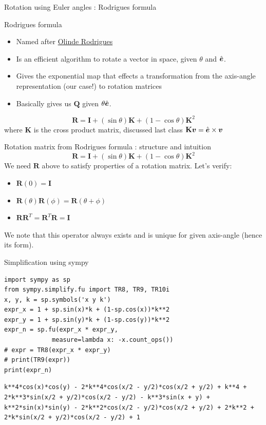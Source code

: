 \documentclass[notes]{beamer}
\newcommand{\gv}[1]{\ensuremath{\mbox{\boldmath$ #1 $}}}
\newcommand{\bv}[1]{\ensuremath{\mathbf{#1}}}
\begin{document}
\begin{frame}[label={sec:org06b4b7f}]{Rotation using Euler angles : Rodrigues formula}
\begin{block}{Rodrigues formula}
\begin{itemize}
\item Named after \href{https://en.wikipedia.org/wiki/Olinde\_Rodrigues}{Olinde Rodrigues}
\item Is an efficient algorithm to rotate a vector in space, given \(\theta\)
and \(\hat{\gv{e}}\).
\item Gives the exponential map that effects a transformation from the
axis-angle representation (our case!) to rotation matrices
\item Basically gives us \(\bv{Q}\) given \(\theta \hat{\gv{e}}\).
\end{itemize}
\[ \mathbf {R} =\mathbf {I} +(\sin \theta )\mathbf {K} +(1-\cos \theta )\mathbf {K} ^{2} \]
where \(\mathbf{K}\) is the cross product matrix, discussed last class \(\mathbf{K}\gv{v} = \hat{\gv{e}} \times \gv{v}\)
\end{block}
\end{frame}
\begin{frame}[label={sec:org87f198e}]{Rotation matrix from Rodrigues formula : structure and intuition}
 \[ \mathbf {R} =\mathbf {I} +(\sin \theta )\mathbf {K} +(1-\cos \theta )\mathbf {K} ^{2} \]
We need \(\bv{R}\) above to satisfy properties of a rotation matrix. Let's verify:
\begin{itemize}
\item \(\bv{R}(0) = \bv{I}\)
\item \(\bv{R}(\theta)\bv{R}(\phi) = \bv{R}(\theta+\phi)\)
\item \(\bv{R}\bv{R}^T = \bv{R}^T\bv{R} = \bv{I}\)
\end{itemize}
We note that this operator always exists and is unique for given axis-angle
(hence its form).
\end{frame}
\begin{frame}[label={sec:org50a22f6},fragile]{Simplification using sympy}
 \begin{verbatim}
import sympy as sp
from sympy.simplify.fu import TR8, TR9, TR10i
x, y, k = sp.symbols('x y k')
expr_x = 1 + sp.sin(x)*k + (1-sp.cos(x))*k**2
expr_y = 1 + sp.sin(y)*k + (1-sp.cos(y))*k**2
expr_n = sp.fu(expr_x * expr_y,
             measure=lambda x: -x.count_ops())
# expr = TR8(expr_x * expr_y)
# print(TR9(expr))
print(expr_n)
\end{verbatim}

\begin{verbatim}
k**4*cos(x)*cos(y) - 2*k**4*cos(x/2 - y/2)*cos(x/2 + y/2) + k**4 + 2*k**3*sin(x/2 + y/2)*cos(x/2 - y/2) - k**3*sin(x + y) + k**2*sin(x)*sin(y) - 2*k**2*cos(x/2 - y/2)*cos(x/2 + y/2) + 2*k**2 + 2*k*sin(x/2 + y/2)*cos(x/2 - y/2) + 1
\end{verbatim}
\end{frame}
\end{document}

